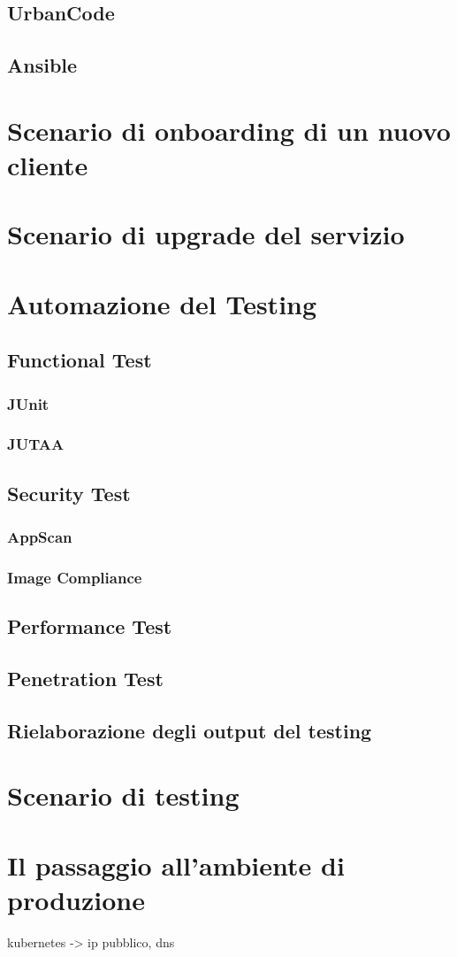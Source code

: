 \subsection{UrbanCode}
\subsection{Ansible}

\section{Scenario di onboarding di un nuovo cliente}

\section{Scenario di upgrade del servizio}

\section{Automazione del Testing}
\subsection{Functional Test}
\subsubsection{JUnit}
\subsubsection{JUTAA}
\subsection{Security Test}
\subsubsection{AppScan}
\subsubsection{Image Compliance}
\subsection{Performance Test}
\subsection{Penetration Test}
\subsection{Rielaborazione degli output del testing}

\section{Scenario di testing}

\section{Il passaggio all'ambiente di produzione}
kubernetes -> ip pubblico, dns

